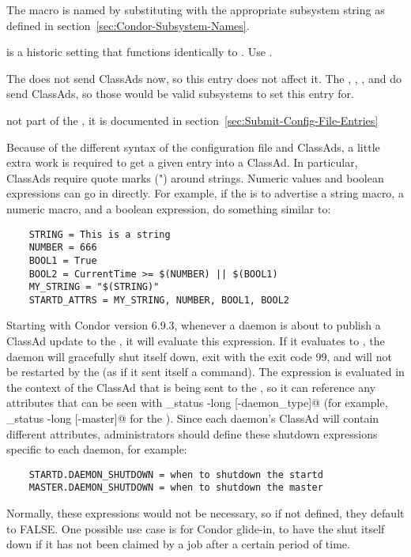 \begin{description}
  The macro is named by substituting 
  with the appropriate subsystem string as defined in
  section~\ref{sec:Condor-Subsystem-Names}.

   is a historic setting that functions identically to
  . Use .

  \Note The  does not send
  ClassAds now, so this entry does not affect it.  The
  , , , and
   do send ClassAds, so those would be valid
  subsystems to set this entry for.
  
   not part of the , it is
  documented in section~\ref{sec:Submit-Config-File-Entries}

  Because of the different syntax of the configuration
  file and ClassAds, a little extra work is required to get a
  given entry into a ClassAd.  In particular, ClassAds require quote
  marks (") around strings.  Numeric values and boolean expressions
  can go in directly.  
  For example, if the  is to advertise a string macro, a numeric
  macro, and a boolean expression, do something similar to:

  \begin{verbatim}
    STRING = This is a string 
    NUMBER = 666
    BOOL1 = True
    BOOL2 = CurrentTime >= $(NUMBER) || $(BOOL1)
    MY_STRING = "$(STRING)"
    STARTD_ATTRS = MY_STRING, NUMBER, BOOL1, BOOL2
  \end{verbatim}

\item[\Macro{DAEMON\_SHUTDOWN}] \label{param:DaemonShutdown}
  Starting with Condor version 6.9.3, whenever a daemon is about to
  publish a ClassAd update to the , it will evaluate
  this expression.
  If it evaluates to , the daemon will gracefully shut itself down,
  exit with the exit code 99,
  and will not be restarted by the  (as if it sent
  itself a  command).
  The expression is evaluated in the context of the ClassAd that is
  being sent to the , so it can reference any
  attributes that can be seen with
  \verb@condor_status -long [-daemon_type]@ (for example,
  \verb@condor_status -long [-master]@ for the ).
  Since each daemon's ClassAd will contain different attributes,
  administrators should define these shutdown expressions specific to
  each daemon, for example:
  \begin{verbatim}
    STARTD.DAEMON_SHUTDOWN = when to shutdown the startd
    MASTER.DAEMON_SHUTDOWN = when to shutdown the master
  \end{verbatim}
  Normally, these expressions would not be necessary, so if not
  defined, they default to FALSE.
  One possible use case is for Condor glide-in, to have the
   shut itself down if it has not been claimed by a job
  after a certain period of time.


\end{description}
